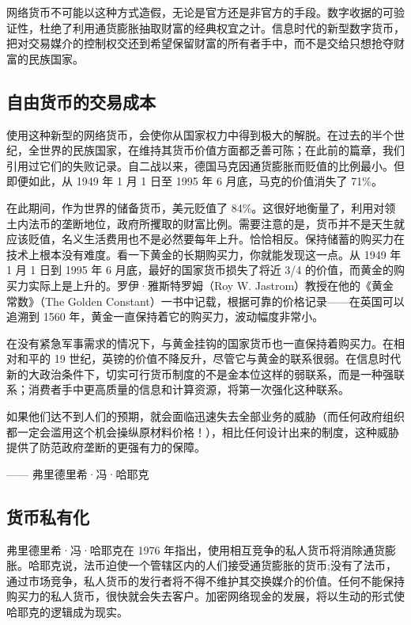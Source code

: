 网络货币不可能以这种方式造假，无论是官方还是非官方的手段。数字收据的可验证性，杜绝了利用通货膨胀抽取财富的经典权宜之计。信息时代的新型数字货币，把对交易媒介的控制权交还到希望保留财富的所有者手中，而不是交给只想抢夺财富的民族国家。

\subsection{自由货币的交易成本}
使用这种新型的网络货币，会使你从国家权力中得到极大的解脱。在过去的半个世纪，全世界的民族国家，在维持其货币价值方面都乏善可陈；在此前的篇章，我们引用过它们的失败记录。自二战以来，德国马克因通货膨胀而贬值的比例最小。但即便如此，从 1949 年 1 月 1 日至 1995 年 6 月底，马克的价值消失了 71\%。

在此期间，作为世界的储备货币，美元贬值了 84\%。这很好地衡量了，利用对领土内法币的垄断地位，政府所攫取的财富比例。需要注意的是，货币并不是天生就应该贬值，名义生活费用也不是必然要每年上升。恰恰相反。保持储蓄的购买力在技术上根本没有难度。看一下黄金的长期购买力，你就能发现这一点。从 1949 年 1 月 1 日到 1995 年 6 月底，最好的国家货币损失了将近 3/4 的价值，而黄金的购买力实际上是上升的。罗伊·雅斯特罗姆（Roy W. Jastrom）教授在他的《黄金常数》（The Golden Constant）一书中记载，根据可靠的价格记录——在英国可以追溯到 1560 年，黄金一直保持着它的购买力，波动幅度非常小。

在没有紧急军事需求的情况下，与黄金挂钩的国家货币也一直保持着购买力。在相对和平的 19 世纪，英镑的价值不降反升，尽管它与黄金的联系很弱。在信息时代新的大政治条件下，切实可行货币制度的不是金本位这样的弱联系，而是一种强联系；消费者手中更高质量的信息和计算资源，将第一次强化这种联系。


\begin{tcolorbox}
\kaishu 如果他们达不到人们的预期，就会面临迅速失去全部业务的威胁（而任何政府组织都一定会滥用这个机会操纵原材料价格！），相比任何设计出来的制度，这种威胁提供了防范政府垄断的更强有力的保障。
\begin{flushright}
—— 弗里德里希·冯·哈耶克  
\end{flushright}
\end{tcolorbox}

\subsection{货币私有化}
弗里德里希·冯·哈耶克在 1976 年指出，使用相互竞争的私人货币将消除通货膨胀。哈耶克说，法币迫使一个管辖区内的人们接受通货膨胀的货币;没有了法币，通过市场竞争，私人货币的发行者将不得不维护其交换媒介的价值。任何不能保持购买力的私人货币，很快就会失去客户。加密网络现金的发展，将以生动的形式使哈耶克的逻辑成为现实。

